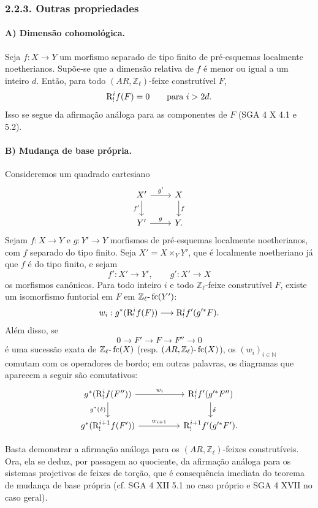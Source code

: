 \subsubsection*{2.2.3. Outras propriedades}

\paragraph{A) Dimensão cohomológica.}
Seja \(f:X\to Y\) um morfismo separado de tipo finito de pré-esquemas localmente noetherianos. Supõe-se que a dimensão relativa de \(f\) é menor ou igual a um inteiro \(d\). Então, para todo \((AR,\mathbb Z_\ell)\)-feixe construtível \(F\),
\[
\mathrm{R}^i_!f(F)=0\qquad\text{para }i>2d.
\]
Isso se segue da afirmação análoga para as componentes de \(F\) (SGA 4 X 4.1 e 5.2).

\paragraph{B) Mudança de base própria.}
Consideremos um quadrado cartesiano
\[
\begin{tikzcd}
X' \arrow[r,"g'"] \arrow[d,"f'"'] & X \arrow[d,"f"]\\
Y' \arrow[r,"g"] & Y .
\end{tikzcd}
\]
Sejam \(f:X\to Y\) e \(g:Y'\to Y\) morfismos de pré-esquemas localmente noetherianos, com \(f\) separado do tipo finito. Seja \(X'=X\times_Y Y'\), que é localmente noetheriano já que \(f\) é do tipo finito, e sejam
\[
f':X'\to Y',\qquad g':X'\to X
\]
os morfismos canônicos. Para todo inteiro \(i\) e todo \(\mathbb Z_\ell\)-feixe construtível \(F\), existe um isomorfismo funtorial em \(F\) em \(\mathbb Z_\ell\text{-}\operatorname{fc}(Y')\):
\[
w_i:g^*(\mathrm{R}^i_!f(F))\longrightarrow \mathrm{R}^i_!f'(g'^*F).
\]
Além disso, se
\[
0\longrightarrow F'\longrightarrow F\longrightarrow F''\longrightarrow 0
\]
é uma sucessão exata de \(\mathbb Z_\ell\text{-}\operatorname{fc}(X)\) (resp. \((AR,\mathbb Z_\ell)\text{-}\operatorname{fc}(X)\)), os \((w_i)_{i\in\mathbb N}\) comutam com os operadores de bordo; em outras palavras, os diagramas que aparecem a seguir são comutativos:
\[
\begin{tikzcd}[column sep=huge]
g^*(\R^i_!f(F'')) \arrow[r,"w_i"] \arrow[d,"g^*(\delta)"']
&
\R^i_!f'(g'^*F'') \arrow[d,"\delta"]\\
g^*(\R^{i+1}_!f(F')) \arrow[r,"w_{i+1}"]
&
\R^{i+1}_!f'(g'^*F').
\end{tikzcd}
\]

\begin{prooftext}[Demonstração]
Basta demonstrar a afirmação análoga para os \((AR,\mathbb Z_\ell)\)-feixes construtíveis. Ora, ela se deduz, por passagem ao quociente, da afirmação análoga para os sistemas projetivos de feixes de torção, que é consequência imediata do teorema de mudança de base própria (cf. SGA 4 XII 5.1 no caso próprio e SGA 4 XVII no caso geral).
\end{prooftext}
